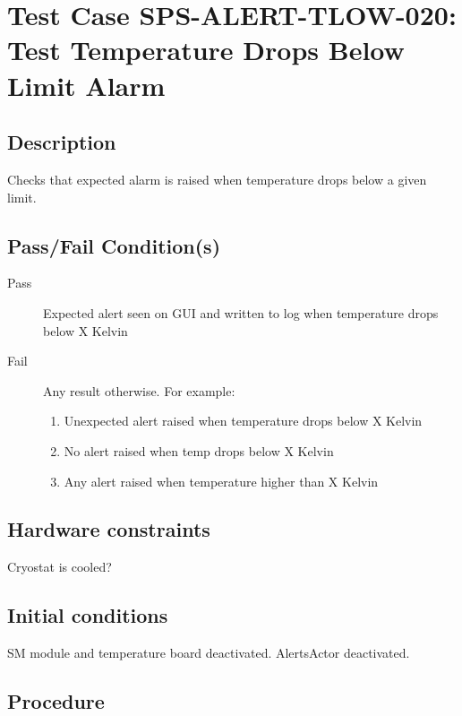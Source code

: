 \section{Test Case SPS-ALERT-TLOW-020: Test Temperature Drops Below Limit Alarm}

\subsection{Description}

Checks that expected alarm is raised when temperature drops below a given limit.

\subsection{Pass/Fail Condition(s)}

\begin{description}
\item [Pass] Expected alert seen on GUI and written to log when temperature drops below X Kelvin
\item [Fail] Any result otherwise. For example:

\begin{enumerate}
    \item Unexpected alert raised when temperature drops below X Kelvin
    \item No alert raised when temp drops below X Kelvin
    \item Any alert raised when temperature higher than X Kelvin
\end{enumerate}
\end{description}

\subsection{Hardware constraints}

Cryostat is cooled?

\subsection{Initial conditions}

SM module and temperature board deactivated. AlertsActor deactivated.

\subsection{Procedure}

